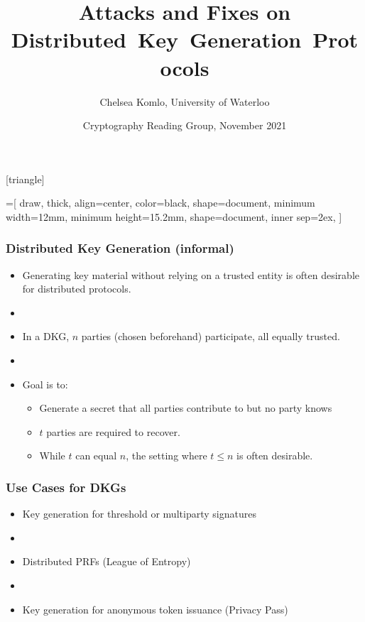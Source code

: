 \documentclass[hyperref={pdfpagelabels=true},table,dvipsnames,14pt,aspectratio=169]{beamer}
\title{Attacks and Fixes on Distributed~Key~Generation~Protocols}
\author{Chelsea Komlo, University of Waterloo}
\date[November 2021]{ Cryptography Reading Group, November 2021}
\begin{document}
[triangle]

=[%
draw,
thick,
align=center,
color=black,
shape=document,
minimum width=12mm,
minimum height=15.2mm,
shape=document,
inner sep=2ex,
]

\begin{frame}
        \thispagestyle{empty}
        \maketitle
\end{frame}


\begin{frame}
  \frametitle{Distributed Key Generation (informal)}

  \begin{itemize}
    \item<1-> Generating key material without relying on a trusted entity is often desirable for distributed protocols.
    \item[]
    \item<2-> In a DKG, $n$ parties (chosen beforehand) participate, all equally trusted.
    \item[]
    \item<3-> Goal is to:
  \begin{itemize}
    \item<4-> Generate a secret that all parties contribute to but no party knows
    \item<5-> $t$ parties are required to recover.
    \item<6-> While $t$ can equal $n$, the setting where $t \leq n$ is often desirable.
  \end{itemize}
  \end{itemize}
\end{frame}

\begin{frame}
  \frametitle{Use Cases for DKGs}

  \begin{itemize}
    \item<1-> Key generation for threshold or multiparty signatures
    \item[]
    \item<2-> Distributed PRFs (League of Entropy)
    \item[]
    \item<3-> Key generation for anonymous token issuance (Privacy Pass)
  \end{itemize}
\end{frame}
\end{document}
